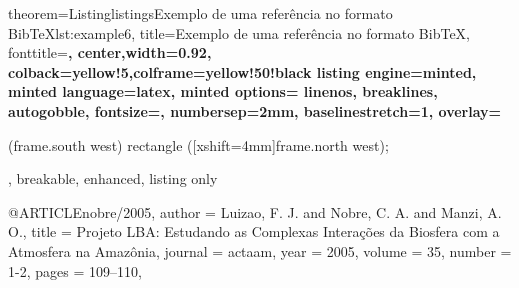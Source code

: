 \documentclass[10pt]{beamer}
\begin{document}
\begin{frame}{}
    \begin{tcblisting}{
        theorem={Listing}{listings}{Exemplo de uma referência no formato Bib\TeX{}}{lst:example6},
        title=Exemplo de uma referência no formato Bib\TeX{},
        fonttitle=\small\bfseries,
        center,width=0.92\paperwidth,
        colback=yellow!5,colframe=yellow!50!black
        listing engine=minted,
        minted language=latex,
        minted options={%
            linenos,
            breaklines,
            autogobble,
            fontsize=\small,
            numbersep=2mm,
            baselinestretch=1},
        overlay={%
        \begin{tcbclipinterior}
            \fill[gray!25] (frame.south west) rectangle ([xshift=4mm]frame.north west);
        \end{tcbclipinterior}},
        breakable, enhanced, listing only}
        @ARTICLE{nobre/2005,
          author    = {Luizao, F. J. and Nobre, C. A. and Manzi, A. O.},
          title     = {Projeto LBA: Estudando as Complexas Intera{\c c}\~oes da Biosfera com a Atmosfera na Amaz\^onia},
          journal   = actaam,
          year      = {2005},
          volume    = {35},
          number    = {1-2},
          pages     = {109--110},
        }
    \end{tcblisting}
\end{frame}
\end{document}
